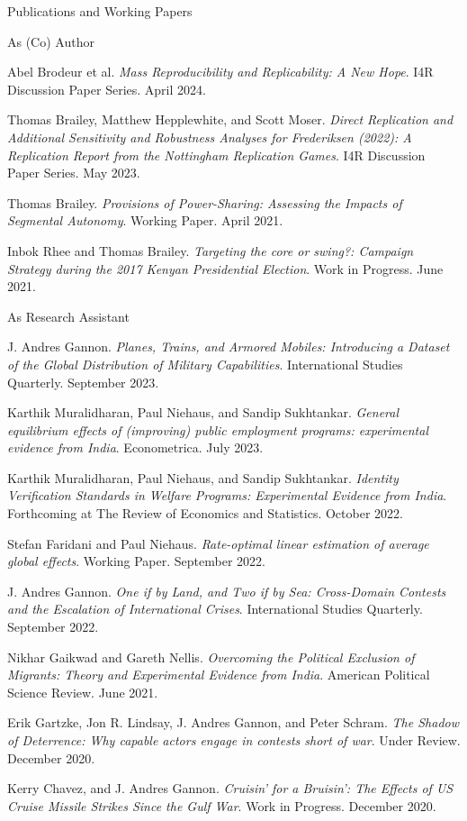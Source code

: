 \documentclass[10pt]{resume} %
\begin{document}
	\begin{rSection}{Publications and Working Papers}\itemsep -5pt
		
		\begin{rSubsection}{As (Co) Author}{}{}{}
		\item Abel Brodeur et al. \textit{Mass Reproducibility and Replicability: A New Hope}. I4R Discussion Paper Series. April 2024.
		\item Thomas Brailey, Matthew Hepplewhite, and Scott Moser. \textit{Direct Replication and Additional Sensitivity and Robustness Analyses for Frederiksen (2022): A Replication Report from the Nottingham Replication Games}. I4R Discussion Paper Series. May 2023.
		\item Thomas Brailey. \textit{Provisions of Power-Sharing: Assessing the Impacts of Segmental Autonomy}. Working Paper. April 2021.
		\item Inbok Rhee and Thomas Brailey. \textit{Targeting the core or swing?: Campaign Strategy during the 2017 Kenyan Presidential Election}. Work in Progress. June 2021.
	  \end{rSubsection}
		
		\begin{rSubsection}{As Research Assistant}{}{}{}
		\item J. Andres Gannon. \textit{Planes, Trains, and Armored Mobiles: Introducing a Dataset of the Global Distribution of Military Capabilities}. International Studies Quarterly. September 2023.
		\item Karthik Muralidharan, Paul Niehaus, and Sandip Sukhtankar. \textit{General equilibrium effects of (improving) public employment programs: experimental evidence from India}. Econometrica. July 2023. 
		\item Karthik Muralidharan, Paul Niehaus, and Sandip Sukhtankar. \textit{Identity Verification Standards in Welfare Programs: Experimental Evidence from India}. Forthcoming at The Review of Economics and Statistics. October 2022. 
		\item Stefan Faridani and Paul Niehaus. \textit{Rate-optimal linear estimation of average global effects}. Working Paper. September 2022.
		\item J. Andres Gannon. \textit{One if by Land, and Two if by Sea: Cross-Domain Contests and the Escalation of International Crises}. International Studies Quarterly. September 2022.
		\item Nikhar Gaikwad and Gareth Nellis. \textit{Overcoming the Political Exclusion of Migrants: Theory and Experimental Evidence from India}. American Political Science Review. June 2021. 
		\item Erik Gartzke, Jon R. Lindsay, J. Andres Gannon, and Peter Schram. \textit{The Shadow of Deterrence: Why capable actors engage in contests short of war}. Under Review. December 2020. 
		\item Kerry Chavez, and J. Andres Gannon. \textit{Cruisin’ for a Bruisin’: The Effects of US Cruise Missile Strikes Since the Gulf War}. Work in Progress. December 2020.
		\end{rSubsection}
	
	\end{rSection}
	
\end{document}
